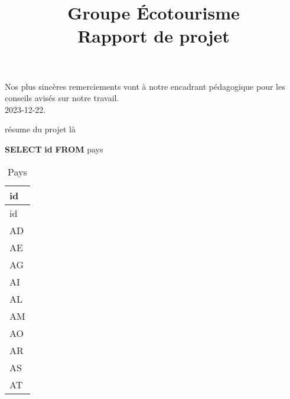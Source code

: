 \documentclass[mstat,12pt]{unswthesis}
\title{Groupe Écotourisme\\[0.5cm]Rapport de projet}
\author{\Authornameonly}
\newenvironment{Shaded}{\begin{snugshade}}{\end{snugshade}}
\newcommand{\KeywordTok}[1]{\textcolor[rgb]{0.13,0.29,0.53}{\textbf{#1}}}
\newcommand{\NormalTok}[1]{#1}
\begin{document}
\begin{adjustwidth}{-2cm}{}

\beforepreface






{\bigskip}Nos plus sincères remerciements vont à notre encadrant
pédagogique pour les conseils avisés sur notre travail.\\[1cm] 

{\bigskip\bigskip\bigskip\noindent} 2023-12-22.




résume du projet là



\afterpreface





%
%






\begin{Shaded}
\begin{Highlighting}[]
\KeywordTok{SELECT} \KeywordTok{id}
\KeywordTok{FROM}\NormalTok{ pays}
\end{Highlighting}
\end{Shaded}

\begin{longtable}[]{@{}l@{}}
\caption{Pays}\tabularnewline
\toprule\noalign{}
id \\
\midrule\noalign{}
\endfirsthead
\toprule\noalign{}
id \\
\midrule\noalign{}
\endhead
\bottomrule\noalign{}
\endlastfoot
AD \\
AE \\
AG \\
AI \\
AL \\
AM \\
AO \\
AR \\
AS \\
AT \\
\end{longtable}


\end{adjustwidth}
\end{document}
